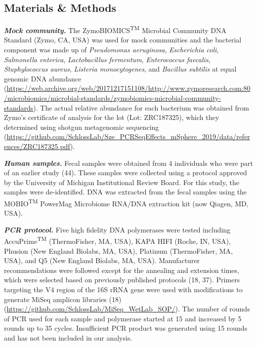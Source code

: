 \documentclass[11pt,]{article}
\begin{document}
\newpage

\hypertarget{materials-methods}{%
\subsection{Materials \& Methods}\label{materials-methods}}

\textbf{\emph{Mock community.}} The ZymoBIOMICS\textsuperscript{TM}
Microbial Community DNA Standard (Zymo, CA, USA) was used for mock
communities and the bacterial component was made up of \emph{Pseudomonas
aeruginosa}, \emph{Escherichia coli}, \emph{Salmonella enterica},
\emph{Lactobacillus fermentum}, \emph{Enterococcus faecalis},
\emph{Staphylococcus aureus}, \emph{Listeria monocytogenes}, and
\emph{Bacillus subtilis} at equal genomic DNA abundance
(\url{https://web.archive.org/web/20171217151108/http://www.zymoresearch.com:80/microbiomics/microbial-standards/zymobiomics-microbial-community-standards}).
The actual relative abundance for each bacterium was obtained from
Zymo's certificate of analysis for the lot (Lot: ZRC187325), which they
determined using shotgun metagenomic sequencing
(\url{https://github.com/SchlossLab/Sze_PCRSeqEffects_mSphere_2019/data/references/ZRC187325.pdf}).

\textbf{\emph{Human samples.}} Fecal samples were obtained from 4
individuals who were part of an earlier study (44). These samples were
collected using a protocol approved by the University of Michigan
Institutional Review Board. For this study, the samples were
de-identified. DNA was extracted from the fecal samples using the
MOBIO\textsuperscript{TM} PowerMag Microbiome RNA/DNA extraction kit
(now Qiagen, MD, USA).

\textbf{\emph{PCR protocol.}} Five high fidelity DNA polymerases were
tested including AccuPrime\textsuperscript{TM} (ThermoFisher, MA, USA),
KAPA HIFI (Roche, IN, USA), Phusion (New England Biolabs, MA, USA),
Platinum (ThermoFisher, MA, USA), and Q5 (New England Biolabs, MA, USA).
Manufacturer recommendations were followed except for the annealing and
extension times, which were selected based on previously published
protocols (18, 37). Primers targeting the V4 region of the 16S rRNA gene
were used with modifications to generate MiSeq amplicon libraries (18)
(\url{https://github.com/SchlossLab/MiSeq_WetLab_SOP/}). The number of
rounds of PCR used for each sample and polymerase started at 15 and
increased by 5 rounds up to 35 cycles. Insufficient PCR product was
generated using 15 rounds and has not been included in our analysis.
\end{document}
